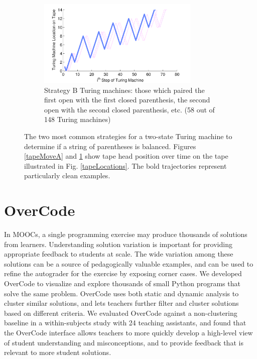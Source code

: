 \begin{figure}[p]
\begin{subfigure}[b]{1.0\textwidth}
\centering
\includegraphics[width=0.85\textwidth]{Body/figures/tmvisualization_NtoNParensMatched_allkidsAnno2}
\caption{Strategy B Turing machines: those which paired the first open with the first closed parenthesis, the second open with the second closed parenthesis, etc. (58 out of 148 Turing machines)}
\label{tapeMoveB}
\end{subfigure}


\caption{The two most common strategies for a two-state Turing machine to determine if a string of parentheses is balanced. Figures \ref{tapeMoveA} and \ref{tapeMoveB} show tape head position over time on the tape illustrated in Fig. \ref{tapeLocations}. The bold trajectories represent particularly clean examples.}
\label{turingFig}
\end{figure}



\section{OverCode}

In MOOCs, a single programming exercise may produce thousands of solutions from learners. Understanding solution variation is important for providing appropriate feedback to students at scale. The wide variation among these solutions can be a source of pedagogically valuable examples, and can be used to refine the autograder for the exercise by exposing corner cases. We developed OverCode to visualize and explore thousands of small Python programs that solve the same problem. OverCode uses both static and dynamic analysis to cluster similar solutions, and lets teachers further filter and cluster solutions based on different criteria. We evaluated OverCode against a non-clustering baseline in a within-subjects study with 24 teaching assistants, and found that the OverCode interface allows teachers to more quickly develop a high-level view of student understanding and misconceptions, and to provide feedback that is relevant to more student solutions.


